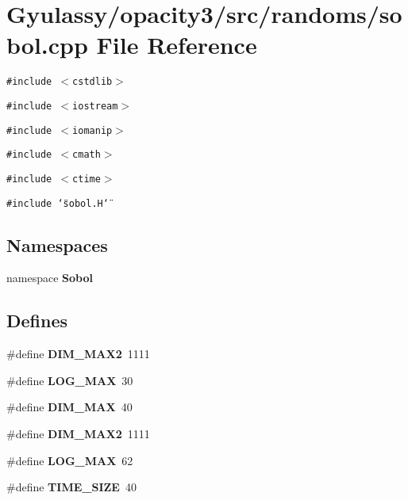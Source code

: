 \section{Gyulassy/opacity3/src/randoms/sobol.cpp File Reference}
\label{sobol_8cpp}
{\tt \#include $<$cstdlib$>$}\par
{\tt \#include $<$iostream$>$}\par
{\tt \#include $<$iomanip$>$}\par
{\tt \#include $<$cmath$>$}\par
{\tt \#include $<$ctime$>$}\par
{\tt \#include \char`\"{}sobol.H\char`\"{}}\par
\subsection*{Namespaces}
\begin{CompactItemize}
\item 
namespace {\bf Sobol}
\end{CompactItemize}
\subsection*{Defines}
\begin{CompactItemize}
\item 
\#define {\bf DIM\_\-MAX2}~1111
\item 
\#define {\bf LOG\_\-MAX}~30
\item 
\#define {\bf DIM\_\-MAX}~40
\item 
\#define {\bf DIM\_\-MAX2}~1111
\item 
\#define {\bf LOG\_\-MAX}~62
\item 
\#define {\bf TIME\_\-SIZE}~40
\end{CompactItemize}
